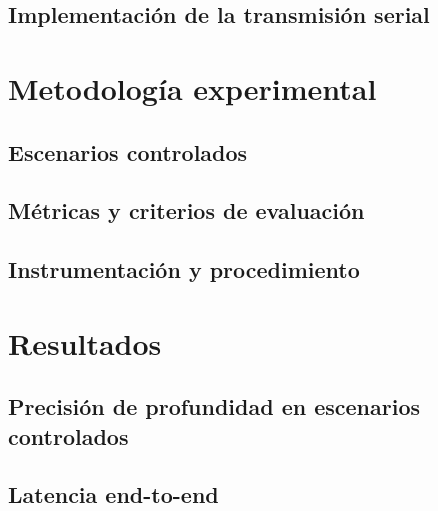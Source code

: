 \section{Implementación de la transmisión serial}

\chapter{Metodología experimental}

\section{Escenarios controlados}

\section{Métricas y criterios de evaluación}

\section{Instrumentación y procedimiento}

\chapter{Resultados}

\section{Precisión de profundidad en escenarios controlados}

\section{Latencia end-to-end}


